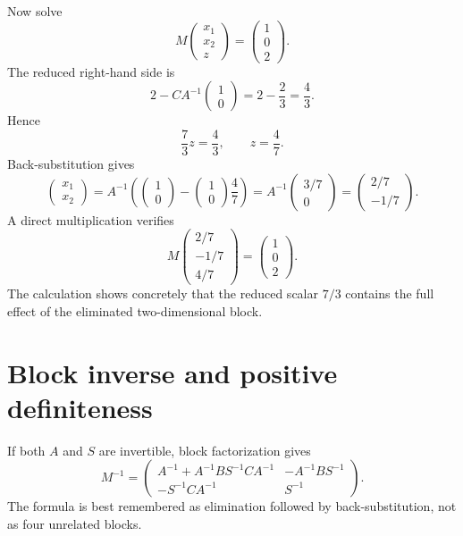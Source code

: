Now solve
\[
  M
  \begin{pmatrix}x_1\\x_2\\z\end{pmatrix}
  =
  \begin{pmatrix}1\\0\\2\end{pmatrix}.
\]
The reduced right-hand side is
\[
  2-CA^{-1}\begin{pmatrix}1\\0\end{pmatrix}
  =2-\frac23=\frac43.
\]
Hence
\[
  \frac73 z=\frac43,
  \qquad
  z=\frac47.
\]
Back-substitution gives
\[
  \begin{pmatrix}x_1\\x_2\end{pmatrix}
  =A^{-1}\left(
    \begin{pmatrix}1\\0\end{pmatrix}
    -\begin{pmatrix}1\\0\end{pmatrix}\frac47
  \right)
  =A^{-1}\begin{pmatrix}3/7\\0\end{pmatrix}
  =\begin{pmatrix}2/7\\-1/7\end{pmatrix}.
\]
A direct multiplication verifies
\[
  M
  \begin{pmatrix}2/7\\-1/7\\4/7\end{pmatrix}
  =
  \begin{pmatrix}1\\0\\2\end{pmatrix}.
\]
The calculation shows concretely that the reduced scalar \(7/3\) contains the full effect of the eliminated two-dimensional block.

\section{Block inverse and positive definiteness}

If both \(A\) and \(S\) are invertible, block factorization gives
\[
M^{-1}=
\begin{pmatrix}
A^{-1}+A^{-1}BS^{-1}CA^{-1}&-A^{-1}BS^{-1}\\
-S^{-1}CA^{-1}&S^{-1}
\end{pmatrix}.
\]
The formula is best remembered as elimination followed by back-substitution, not as four unrelated blocks.

